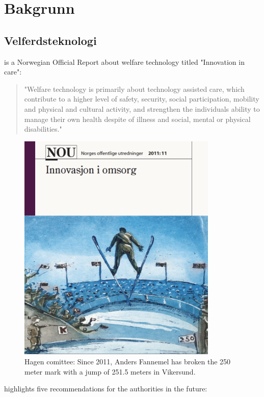 \chapter[Bakgrunn]{Bakgrunn}
\label{ch:background}
\blindtext

\section{Velferdsteknologi}
\citet{regjeringen_hagen} is a Norwegian Official Report about welfare technology titled
"Innovation in care":

\blockquote{
    "Welfare technology is primarily about technology assisted care, which
    contribute to a higher level of safety, security, social participation, mobility and
    physical and cultural activity, and strengthen the individuals ability to manage their own health
    despite of illness and social, mental or physical disabilities."
}

\begin{figure}
\includegraphics[width=0.85\textwidth,center]{fig/hagen}
\caption{Hagen comittee: Since 2011, Anders Fannemel has broken the 250 meter mark with a jump of 251.5 meters in Vikersund. }
\label{fig:hagen}
\end{figure}

\citet{regjeringen_hagen} highlights five recommendations for the authorities in the future:

